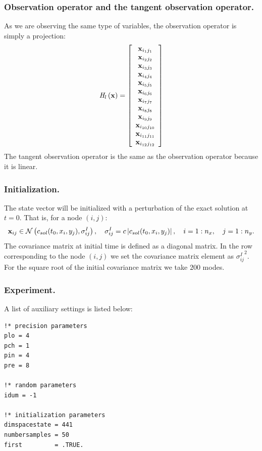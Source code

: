 \documentclass[12pt]{article}
\begin{document}
\subsubsection{Observation operator and the tangent observation operator.}
As we are observing the same type of variables, the observation operator is simply a projection:
\begin{equation}
{\it H}_l \left( {\bf x} \right) = \left[ \begin{array}{c} {\bf x}_{i_1 j_1} \\ {\bf x}_{i_2 j_2} \\ {\bf x}_{i_3 j_3} \\ {\bf x}_{i_4 j_4} \\ {\bf x}_{i_5 j_5} \\ {\bf x}_{i_6 j_6} \\ {\bf x}_{i_7 j_7} \\ {\bf x}_{i_8 j_8} \\ {\bf x}_{i_9 j_9} \\ {\bf x}_{i_{10} j_{10}} \\ {\bf x}_{i_{11} j_{11}} \\ {\bf x}_{i_{12} j_{12}} \end{array} \right]
\end{equation}
The tangent observation operator is the same as the observation operator because it is linear.

\subsubsection{Initialization.}
The state vector will be initialized with a perturbation of the exact solution at $t = 0$. That is, for a node $( i , j )$:
\begin{equation}
{\bf x}_{ij} \in \mathcal{N} \left( c_{sol}( t_{0} , x_i , y_j ) , {\sigma}_{i j}^I \right), \quad {\sigma}_{i j}^I = c \left| c_{sol}( t_{0} , x_i , y_j )  \right|, \quad i = 1 : n_x, \quad j = 1 : n_y.
\end{equation}
The covariance matrix at initial time is defined as a diagonal matrix. In the row corresponding to the node $( i , j )$ we set the covariance matrix element as ${{\sigma}_{i j}^I}^2$. For the square root of the initial covariance matrix we take $200$ modes.

\subsubsection{Experiment.}
A list of auxiliary settings is listed below:
\begin{verbatim}
!* precision parameters	
plo = 4
pch = 1
pin = 4
pre = 8

!* random parameters
idum = -1

!* initialization parameters
dimspacestate = 441
numbersamples = 50
first         = .TRUE.
\end{verbatim}
\end{document}
